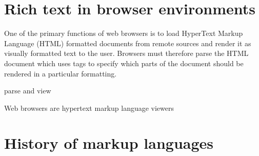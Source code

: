 \section{Rich text in browser environments}

One of the primary functions of web browsers is to load HyperText Markup Language (HTML) formatted documents from remote sources and render it as visually formatted text to the user. Browsers must therefore parse the HTML document which uses tags to specify which parts of the document should be rendered in a particular formatting.

parse and view 


Web browsers are hypertext markup language viewers


\section{History of markup languages}